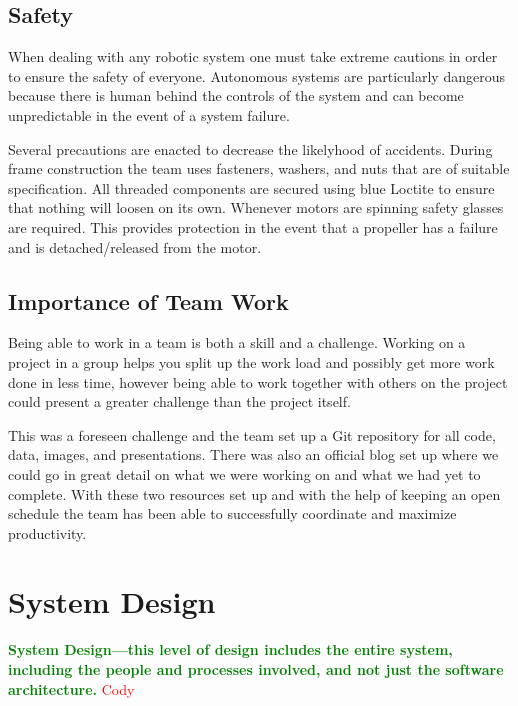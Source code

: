 \documentclass{article}
\numberwithin{equation}{section} %
\begin{document}

\subsection{Safety}

When dealing with any robotic system one must take extreme cautions in order to ensure the safety of everyone. Autonomous systems are particularly dangerous because there is human behind the controls of the system and can become unpredictable in the event of a system failure. 

Several precautions are enacted to decrease the likelyhood of accidents. During frame construction the team uses fasteners, washers, and nuts that are of suitable specification. All threaded components are secured using blue Loctite to ensure that nothing will loosen on its own. Whenever motors are spinning safety glasses are required. This provides protection in the event that a propeller has a failure and is detached/released from the motor.

\subsection{Importance of Team Work}
Being able to work in a team is both a skill and a challenge. Working on a project in a group helps you split up the work load and possibly get more work done in less time, however being able to work together with others on the project could present a greater challenge than the project itself. 

This was a foreseen challenge and the team set up a Git repository for all code, data, images, and presentations. There was also an official blog set up where we could go in great detail on what we were working on and what we had yet to complete. With these two resources set up and with the help of keeping an open schedule the team has been able to successfully coordinate and maximize productivity.


\clearpage %
\section{System Design}
\textcolor{green}{\bf System Design—this level of design includes the entire system, including the people and processes involved, and not just the software architecture.}
\textcolor{red}{Cody}
\end{document}
